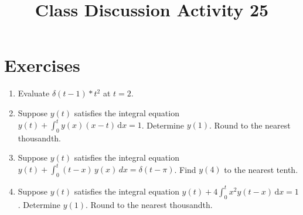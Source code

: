 \documentclass{ximera}
\begin{document}
\begin{abstract}
 \end{abstract}

    \title{Class Discussion Activity 25}
    
    \maketitle

\section*{Exercises}

\begin{enumerate}[label=(\arabic*)]

\item Evaluate $\delta(t-1)\ast t^2$ at $t=2$.  




\item Suppose $y(t)$ satisfies the integral equation $\displaystyle y(t)+\int_0^t y(x)(x-t)\,\mathrm{d}x=1$.  Determine $y(1)$.  Round to the nearest thousandth.











\item Suppose $y(t)$ satisfies the integral equation \\$\displaystyle y(t)+\int_0^t  (t-x)\,y(x)\,dx=\delta{(t-\pi)}$.  Find $y(4)$ to the nearest tenth.







\item Suppose $y(t)$ satisfies the integral equation $\displaystyle y(t)+4\int_0^t  x^2y(t-x)\,\mathrm{d}x=1$.  Determine $y(1)$.  Round to the nearest thousandth.



\end{enumerate}
\end{document}
